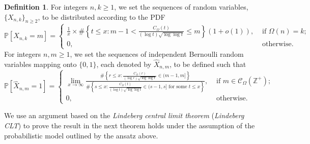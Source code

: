 \documentclass[11pt,reqno,a4letter]{article}
\makeatletter
\numberwithin{figure}{section}
\numberwithin{table}{section}
\newcommand*\rel@kern[1]{\kern#1\dimexpr\macc@kerna}
\newcommand*\widebar[1]{%
  \begingroup
  \def\mathaccent##1##2{%
    \rel@kern{0.8}%
    \overline{\rel@kern{-0.8}\macc@nucleus\rel@kern{0.2}}%
    \rel@kern{-0.2}%
  }%
  \macc@depth\@ne
  \let\math@bgroup\@empty \let\math@egroup\macc@set@skewchar
  \mathsurround\z@ \frozen@everymath{\mathgroup\macc@group\relax}%
  \macc@set@skewchar\relax
  \let\mathaccentV\macc@nested@a
  \macc@nested@a\relax111{#1}%
  \endgroup
}
\theoremstyle{plain}
\numberwithin{theorem}{section}
\theoremstyle{definition}
\newtheorem{definition}[theorem]{Definition}
\makeatother
\begin{document}
\begin{definition}
For integers $n,k \geq 1$, we set the sequences of random variables, $\{X_{n,k}\}_{n \geq 2}$, to be 
distributed according to the PDF 
\[
\mathbb{P}\left[X_{n,k} = m\right] = \begin{cases} 
     \frac{1}{x} \times \#\left\{ t \leq x: m-1 < \frac{C_{\Omega}(t)}{(\log t)\sqrt{\log\log t}} \leq m\right\} 
     (1 + o(1)), & 
     \text{ if $\Omega(n) = k$; } \\ 
     0, & \text{ otherwise. }
     \end{cases} 
\]
For integers $n,m \geq 1$, we set the sequences of independent Bernoulli random variables 
mapping onto $\{0,1\}$, each denoted by  
$\widehat{X}_{n,m}$, to be defined such that 
\[
\mathbb{P}\left[\widehat{X}_{n,m} = 1\right] = \begin{cases} 
     \lim\limits_{x \rightarrow \infty} \frac{\#\left\{ r \leq x: 
     \frac{C_{\Omega}(r)}{(\log r) \sqrt{\log\log r}} \in (m-1, m]\right\}}{ 
     \#\left\{s \leq x: \frac{C_{\Omega}(t)}{(\log t)\sqrt{\log\log t}} \in (s-1, s] \text{ for some } 
     t \leq x \right\}}, & 
     \text{ if $m \in \mathcal{C}_{\Omega}(\mathbb{Z}^{+})$; } \\ 
     0, & \text{ otherwise. } 
     \end{cases} 
\]
\end{definition}

We use an argument based on the \emph{Lindeberg central limit theorem} (\emph{Lindeberg CLT}) to prove the 
result in the next theorem holds under the assumption of the probabilistic model outlined by the ansatz above. 
\end{document}
